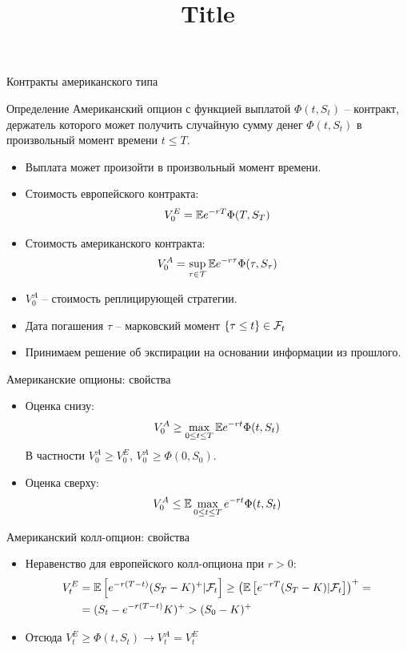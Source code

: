 \documentclass[aspectratio=169]{beamer}
\title[Американский опцион]{Title} %
\begin{document}
\begin{frame}{Контракты американского типа}

    \begin{block}{Определение}
        Американский опцион с функцией выплатой $\Phi(t, S_t)$ -- контракт, 
        держатель которого может получить случайную сумму денег $\Phi(t, S_t)$ в произвольный момент времени $t \leq T$.
    \end{block}

    \begin{itemize}
        \item Выплата может произойти в произвольный момент времени.
        \item Стоимость европейского контракта:
        $$
            V_0^E = \mathbb{E} e^{-rT} \Phi(T, S_T)
        $$
        \item Стоимость американского контракта:
        $$
            V_0^A = \sup_{\tau \in \mathcal{T}} \mathbb{E} e^{-r\tau} \Phi(\tau, S_{\tau})
        $$
        \item $V_0^A$ -- стоимость реплицирующей стратегии.
        \item Дата погашения $\tau$ -- марковский момент $\{\tau \leq t\} \in \mathcal{F}_t$
        \item Принимаем решение об экспирации на основании информации из прошлого.    
    \end{itemize}
\end{frame}


\begin{frame}{Американские опционы: свойства}
    \begin{itemize}
        \item Оценка снизу:
        $$
            V_0^A \geq \max_{0\leq t \leq T} \mathbb{E} e^{-rt} \Phi(t, S_{t})
        $$В частности $V_0^A \geq V_0^E$, $V_0^A \geq \Phi(0, S_0)$.
        \item Оценка сверху:
        $$
            V_0^A \leq \mathbb{E} \max_{0 \leq t \leq T} e^{-rt} \Phi(t, S_{t})
        $$
    \end{itemize}
\end{frame}

\begin{frame}{Американский колл-опцион: свойства}
    \begin{itemize}
        \item Неравенство для европейского колл-опциона при $r>0$:
        \begin{align*}
            V_t^E &= \mathbb{E}\left[e^{-r(T-t)} (S_T - K)^+ | \mathcal{F}_t \right]
            \geq \left(\mathbb{E}\left[e^{-rT}(S_T - K)| \mathcal{F}_t \right]\right)^+ = \\
            &= (S_t - e^{-r(T-t)}K)^+ > (S_0 - K)^+
        \end{align*}
        \item Отсюда $V_t^E \geq \Phi(t, S_t) \to V_t^A = V_t^E$
    \end{itemize}
\end{frame}
\end{document}
